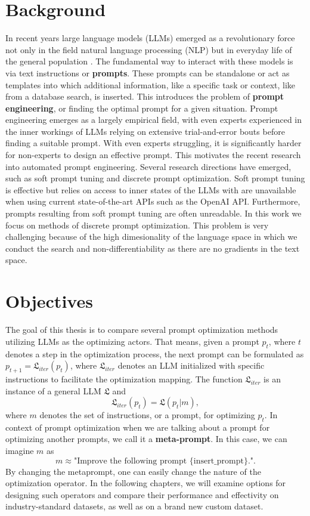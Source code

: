 \section{Background}
In recent years large language models (LLMs) emerged as a revolutionary force not only in the field natural language processing (NLP) but in everyday life of the general population . 
The fundamental way to interact with these models is via text instructions or \textbf{prompts}. These prompts can be standalone or act as templates into which additional information,
like a specific task or context, like from a database search, is inserted. This introduces the problem of \textbf{prompt engineering}, or finding the optimal prompt for a given situation.
Prompt engineering emerges as a largely empirical field, with even experts experienced in the inner workings of LLMs relying on extensive trial-and-error bouts before finding a suitable prompt. 
With even experts struggling, it is significantly harder for non-experts to design an effective prompt. This motivates the recent research into automated prompt engineering. Several research directions have
emerged, such as soft prompt tuning and discrete prompt optimization. Soft prompt tuning is effective but relies on access to inner states of the LLMs with are unavailable when using current state-of-the-art APIs such as
the OpenAI API. Furthermore, prompts resulting from soft prompt tuning are often unreadable. In this work we focus on methods of discrete prompt optimization. This problem is very challenging because of the high dimesionality of the language space in which we
conduct the search and non-differentiability as there are no gradients in the text space.

\section{Objectives}
The goal of this thesis is to compare several prompt optimization methods utilizing LLMs as the optimizing actors. That means, given a prompt $p_t$, where 
$t$ denotes a step in the optimization process, the next prompt can be formulated as $p_{t+1}=\mathfrak{L}_{iter}(p_t)$, where $\mathfrak{L}_{iter}$ denotes
an LLM initialized with specific instructions to facilitate the optimization mapping. The function $\mathfrak{L}_{iter}$ is an instance of a general LLM $\mathfrak{L}$ and 
\begin{equation}
    \mathfrak{L}_{iter}(p_t) = \mathfrak{L}(p_t|m),
\end{equation}
where $m$ denotes the set of instructions, or a prompt, for optimizing $p_t$. In context of prompt optimization when we are talking about a prompt for optimizing another prompts, we call it a \textbf{meta-prompt}.
In this case, we can imagine $m$ as 
\begin{equation*}
    m \approx \text{"Improve the following prompt \{insert_prompt\}."}.
\end{equation*}
By changing the metaprompt, one can easily change the nature of the optimization operator. In the following chapters, we will examine options for designing such operators and 
compare their performance and effectivity on industry-standard datasets, as well as on a brand new custom dataset.